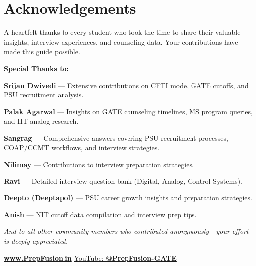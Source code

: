 
\chapter*{Acknowledgements}

A heartfelt thanks to every \PrepFusion student who took the time to share their
valuable insights, interview experiences, and counseling data. Your contributions
have made this guide possible.

\vspace{1em}

\noindent\textbf{Special Thanks to:}

\begin{pfChecklist}
  \item \textbf{Srijan Dwivedi} --- Extensive contributions on CFTI mode, GATE
        cutoffs, and PSU recruitment analysis.
  \item \textbf{Palak Agarwal} --- Insights on GATE counseling timelines,
        MS program queries, and IIT analog research.
  \item \textbf{Sangrag} --- Comprehensive answers covering PSU recruitment
        processes, COAP/CCMT workflows, and interview strategies.
  \item \textbf{Nilimay} --- Contributions to interview preparation strategies.
  \item \textbf{Ravi} --- Detailed interview question bank (Digital, Analog,
        Control Systems).
  \item \textbf{Deepto (Deeptapol)} --- PSU career growth insights and
        preparation strategies.
  \item \textbf{Anish} --- NIT cutoff data compilation and interview prep tips.
\end{pfChecklist}

\vspace{1em}

\noindent\textit{And to all other \PrepFusion community members who contributed
anonymously---your effort is deeply appreciated.}

\vspace{2em}

\begin{center}
  \href{https://prepfusion.in}{\textcolor{pfBlue}{\textbf{www.PrepFusion.in}}}
  \qquad
  \href{https://youtube.com/@PrepFusion-GATE}{YouTube: \textbf{@PrepFusion-GATE}}
\end{center}
